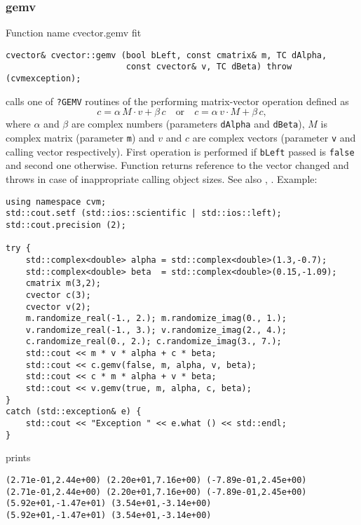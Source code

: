 \subsubsection{gemv}
Function%
\pdfdest name {cvector.gemv} fit
\begin{verbatim}
cvector& cvector::gemv (bool bLeft, const cmatrix& m, TC dAlpha,
                        const cvector& v, TC dBeta) throw (cvmexception);
\end{verbatim}
calls one of \verb"?GEMV" routines of the
performing  matrix-vector operation defined as
\begin{equation*}
c=\alpha\,M\cdot v + \beta\,c\quad\text{or}\quad c=\alpha\,v\cdot M + \beta\, c,
\end{equation*}
where $\alpha$ and $\beta$ are complex numbers
(parameters \verb"dAlpha" and \verb"dBeta"),
$M$ is  complex matrix (parameter \verb"m")
and $v$ and $c$ are complex vectors (parameter \verb"v"
and calling vector respectively).
First operation is performed if \verb"bLeft" passed
is \verb"false" and second one otherwise.
Function
returns  reference to the vector changed and throws
in case of inappropriate calling object sizes.
See also
,
.
Example:
\begin{Verbatim}
using namespace cvm;
std::cout.setf (std::ios::scientific | std::ios::left);
std::cout.precision (2);

try {
    std::complex<double> alpha = std::complex<double>(1.3,-0.7);
    std::complex<double> beta  = std::complex<double>(0.15,-1.09);
    cmatrix m(3,2);
    cvector c(3);
    cvector v(2);
    m.randomize_real(-1., 2.); m.randomize_imag(0., 1.);
    v.randomize_real(-1., 3.); v.randomize_imag(2., 4.);
    c.randomize_real(0., 2.); c.randomize_imag(3., 7.);
    std::cout << m * v * alpha + c * beta;
    std::cout << c.gemv(false, m, alpha, v, beta);
    std::cout << c * m * alpha + v * beta;
    std::cout << v.gemv(true, m, alpha, c, beta);
}
catch (std::exception& e) {
    std::cout << "Exception " << e.what () << std::endl;
}
\end{Verbatim}
prints
\begin{Verbatim}
(2.71e-01,2.44e+00) (2.20e+01,7.16e+00) (-7.89e-01,2.45e+00)
(2.71e-01,2.44e+00) (2.20e+01,7.16e+00) (-7.89e-01,2.45e+00)
(5.92e+01,-1.47e+01) (3.54e+01,-3.14e+00)
(5.92e+01,-1.47e+01) (3.54e+01,-3.14e+00)
\end{Verbatim}
\newpage



